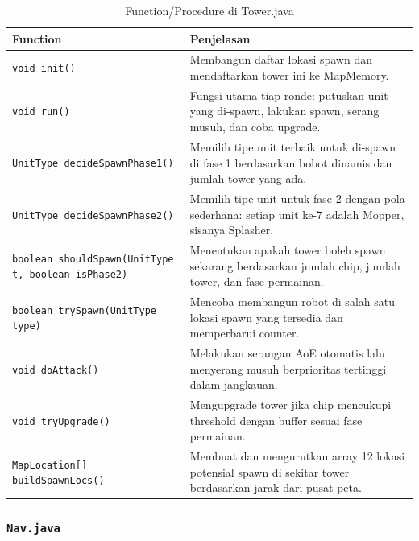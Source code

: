 \documentclass{article}
\begin{document}
\begin{enumerate}[label=\alph*.]
\begin{longtable}{|p{}|p{}|}
    \caption{Function/Procedure di Tower.java} \\
\hline
\textbf{Function} & \textbf{Penjelasan} \\
\hline
\endhead
\hline
\endfoot
\texttt{void init()} & Membangun daftar lokasi spawn dan mendaftarkan tower ini ke MapMemory. \\
\hline
\texttt{void run()} & Fungsi utama tiap ronde: putuskan unit yang di-spawn, lakukan spawn, serang musuh, dan coba upgrade. \\
\hline
\texttt{UnitType decideSpawnPhase1()} & Memilih tipe unit terbaik untuk di-spawn di fase 1 berdasarkan bobot dinamis dan jumlah tower yang ada. \\
\hline
\texttt{UnitType decideSpawnPhase2()} & Memilih tipe unit untuk fase 2 dengan pola sederhana: setiap unit ke-7 adalah Mopper, sisanya Splasher. \\
\hline
\texttt{boolean shouldSpawn(UnitType t, boolean isPhase2)} & Menentukan apakah tower boleh spawn sekarang berdasarkan jumlah chip, jumlah tower, dan fase permainan. \\
\hline
\texttt{boolean trySpawn(UnitType type)} & Mencoba membangun robot di salah satu lokasi spawn yang tersedia dan memperbarui counter. \\
\hline
\texttt{void doAttack()} & Melakukan serangan AoE otomatis lalu menyerang musuh berprioritas tertinggi dalam jangkauan. \\
\hline
\texttt{void tryUpgrade()} & Mengupgrade tower jika chip mencukupi threshold dengan buffer sesuai fase permainan. \\
\hline
\texttt{MapLocation[] buildSpawnLocs()} & Membuat dan mengurutkan array 12 lokasi potensial spawn di sekitar tower berdasarkan jarak dari pusat peta. \\
\hline
\end{longtable}

\subsubsection{\lstinline|Nav.java|}


\end{enumerate}
\end{document}
